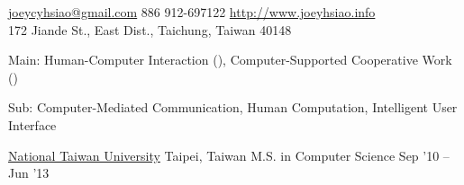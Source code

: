\documentclass[10pt, a4paper]{article} %
\begin{document}
 



\noindent\href{mailto:joeycyhsiao@gmail.com}{joeycyhsiao@gmail.com}\bull %
\textsmaller{+}886 912-697122\bull %
\href{http://www.joeyhsiao.info}{http://www.joeyhsiao.info}\\ %
172 Jiande St., East Dist., Taichung, Taiwan 40148 

\spacedhrule{1.5em}{-1em} %






Main: Human-Computer Interaction (), Computer-Supported Cooperative Work () 

Sub: Computer-Mediated Communication, Human Computation, Intelligent User Interface

\spacedhrule{1.5em}{-1em} %



\headedsection %
{\href{http://www.ntu.edu.tw}{National Taiwan University}}
{Taipei, Taiwan}
{\headedsubsection %
	{M.S. in Computer Science}
	{Sep '10 -- Jun '13}
	{}
}
\end{document}
